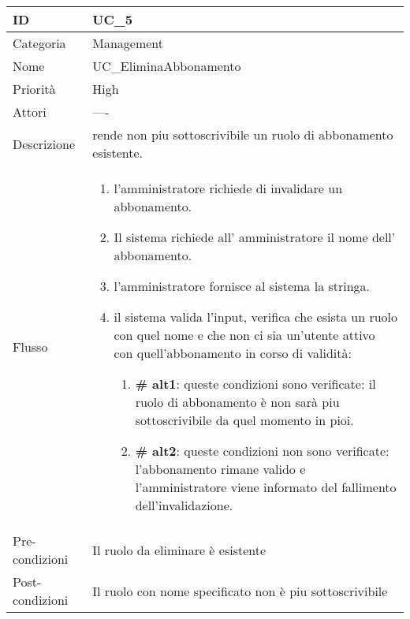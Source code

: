 \begin{center}
\begin{tabular}{ |p{2cm}|p{13cm}|  }
\hline
ID & UC\_5 \\\hline
Categoria & Management\\\hline
Nome & UC\_EliminaAbbonamento\\\hline
Priorità & High \\\hline
Attori &  ---- \\\hline
Descrizione & rende non piu sottoscrivibile un ruolo di abbonamento esistente.\\\hline
Flusso &  	\begin{enumerate}
			\item l'amministratore richiede di invalidare un abbonamento.
			\item Il sistema richiede all' amministratore il nome dell' abbonamento.
			\item l'amministratore fornisce al sistema la stringa.
			\item il sistema valida l'input, verifica che esista un ruolo con quel nome e che non ci sia un'utente attivo con quell'abbonamento in corso di validità:
				\begin{enumerate}[  ]
					\item \textbf{\# alt1}: queste condizioni sono verificate: il ruolo di abbonamento è non sarà piu sottoscrivibile da quel momento in pioi.
					\item \textbf{\# alt2}: queste condizioni non sono verificate: l'abbonamento rimane valido e l'amministratore viene informato del fallimento dell'invalidazione.
				\end{enumerate}
		\end{enumerate}\\\hline
Pre-condizioni &  Il ruolo da eliminare è esistente\\\hline
Post-condizioni &  Il ruolo con nome specificato non è piu sottoscrivibile\\\hline
\end{tabular}
\label{table_use_case:5}\newline


\end{center}
